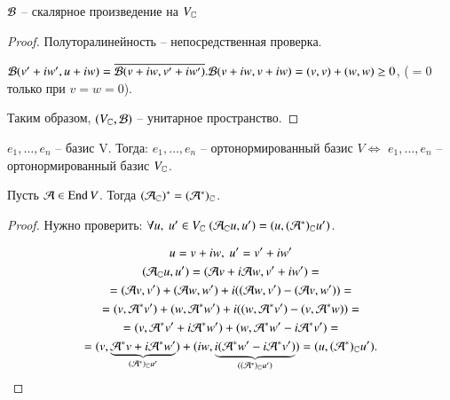 \documentclass[main]{subfiles}
\begin{document}
    \begin{proposition}
        $\mathcal{B}$ -- скалярное произведение на $V_{\mathbb{C}}$
    \end{proposition}
    \begin{proof}
        Полуторалинейность -- непосредственная проверка. 

        $\mathcal{B}(v'+iw', u+iw) = \overline{\mathcal{B}(v + i w, v' + iw')}. 
        \mathcal{B}(v + iw, v + iw) = (v, v) + (w, w) \geq 0$, ($=0$ только при $v = w = 0$).

        Таким образом, $(V_{\mathbb{C}}, \mathcal{B})$ -- унитарное пространство.
    \end{proof}

    \begin{remark}
         $e_1, \ldots, e_n$ -- базис V. Тогда: $e_1, \ldots, e_n$ -- ортонормированный базис $V \Leftrightarrow$  $e_1, \ldots, e_n$ -- ортонормированный базис $V_{\mathbb{C}}$.
    \end{remark}

    \begin{proposition}
        Пусть $\mathcal{A} \in \operatorname{End} V$. Тогда $(\mathcal{A}_{\mathbb{C}})^* = (\mathcal{A}^*)_{\mathbb{C}}$.
    \end{proposition}

    \begin{proof}
        Нужно проверить: $\forall u, \ u' \in V_{\mathbb{C}} \ (\mathcal{A}_{\mathbb{C}}u, u') = (u, (\mathcal{A}^*)_{\mathbb{C}} u')$. 

        \begin{gather*}
            u = v + iw, \ u' = v' + iw' \\
            (\mathcal{A}_{\mathbb{C}}u, u') = (\mathcal{A} v + i \mathcal{A} w, v' + iw') = \\
            = (\mathcal{A} v, v') + (\mathcal{A} w, w') + i((\mathcal{A} w, v') - (\mathcal{A} v, w')) = \\
            = (v, \mathcal{A}^* v') + (w, \mathcal{A}^* w') + i((w, \mathcal{A}^* v') - (v, \mathcal{A}^*w)) = \\
            = (v, \mathcal{A}^*v' + i\mathcal{A}^*w') + (w, \mathcal{A}^*w' - i\mathcal{A}^* v') = \\
            = (v, \underbrace{\mathcal{A}^*v+ i\mathcal{A}^* w'}_{(\mathcal{A}^*)_{\mathbb{C}}u'}) + (iw, \underbrace{i(\mathcal{A}^*w'-i\mathcal{A}^*v')}_{((\mathcal{A}^*)_{\mathbb{C}}u')}) = (u, (\mathcal{A}^*)_{\mathbb{C}} u').
        \end{gather*}
    \end{proof}
\end{document}
